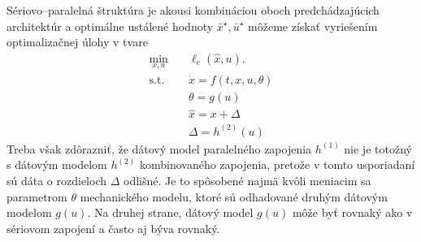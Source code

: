 Sériovo--paralelná štruktúra je akousi kombináciou oboch predchádzajúcich architektúr a optimálne ustálené hodnoty $ \bar{x}^{\star}, \bar{u}^{\star} $ môžeme získať vyriešením  optimalizačnej úlohy v tvare
\begin{equation}
	\begin{split}
		\min_{x,u} &\quad \ell_e\left(\hat{x},u\right).\\
		\text{s.t.} &\quad \dot{x} = f\left(t,x,u,\theta\right)\\
		&\quad \theta = g(u) \\
		&\quad \hat{x} = x + \Delta\\
		&\quad \Delta = h^{(2)}(u)
	\end{split}
\end{equation}
Treba však zdôrazniť, že dátový model paralelného zapojenia $ h^{(1)} $ nie je totožný s dátovým modelom $ h^{(2)} $ kombinovaného zapojenia, pretože v tomto usporiadaní sú dáta o rozdieloch $ \Delta $ odlišné. Je to spôsobené najmä kvôli meniacim sa parametrom $ \theta $ mechanického modelu, ktoré sú odhadované druhým dátovým modelom $ g(u) $. Na druhej strane, dátový model $ g(u) $ môže byť rovnaký ako v sériovom zapojení a často aj býva rovnaký. 